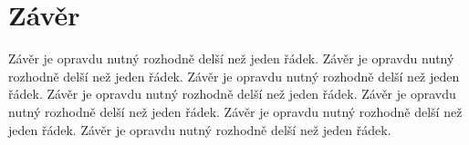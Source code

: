 ﻿\chapter{Závěr}
Závěr je opravdu nutný  rozhodně delší než jeden řádek. Závěr je opravdu nutný  rozhodně delší než jeden řádek. Závěr je opravdu nutný  rozhodně delší než jeden řádek. Závěr je opravdu nutný  rozhodně delší než jeden řádek. Závěr je opravdu nutný  rozhodně delší než jeden řádek. Závěr je opravdu nutný  rozhodně delší než jeden řádek. Závěr je opravdu nutný  rozhodně delší než jeden řádek. 
